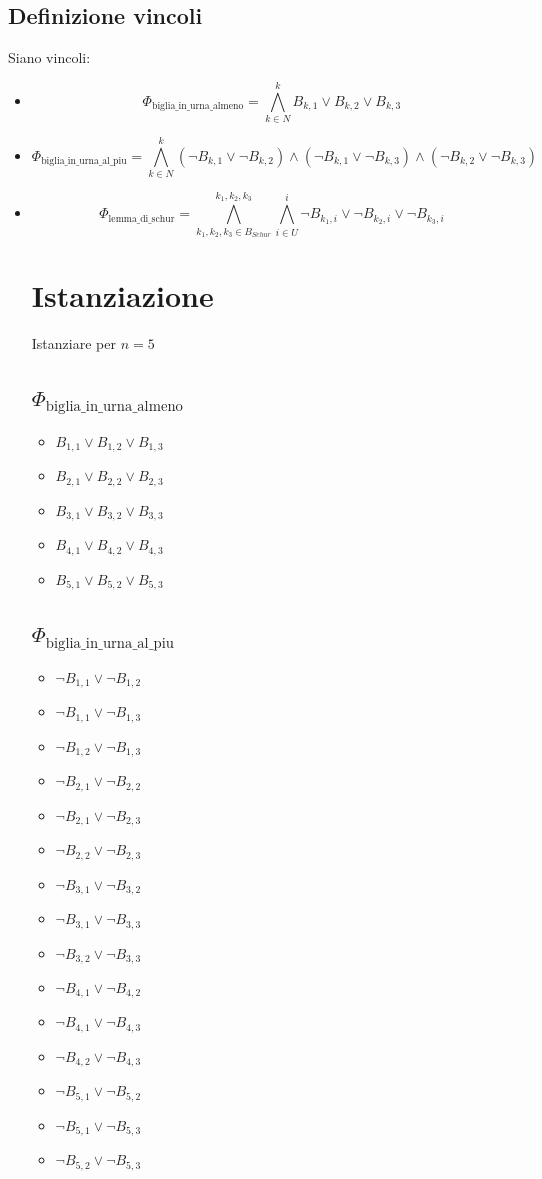 \documentclass[a4paper, 12pt]{article}
\begin{document}
\subsection{Definizione vincoli}
Siano vincoli:
\begin{itemize}[label={}]
    \item \[\Phi_{\text{biglia\_in\_urna\_almeno}}=\bigwedge_{k\in N}^{k}B_{k,1}\lor B_{k,2} \lor B_{k,3}\]
    \item \[\Phi_{\text{biglia\_in\_urna\_al\_piu}} = \bigwedge_{k\in N}^{k}(\lnot B_{k,1}\lor \lnot B_{k,2})\land (\lnot B_{k,1}\lor \lnot B_{k,3}) \land(\lnot B_{k,2}\lor \lnot B_{k,3})\]
    \item \[\Phi_{\text{lemma\_di\_schur}} = \bigwedge_{k_1,k_2,k_3\in B_{Schur}}^{k_1,k_2,k_3} \bigwedge_{i\in U}^{i} \lnot B_{k_1,i} \lor \lnot B_{k_2,i} \lor \lnot B_{k_3,i}
    \]
\section{Istanziazione}
Istanziare per $n = 5$
\subsection{$\Phi_{\text{biglia\_in\_urna\_almeno}}$}
\begin{itemize}[label={}]
\item $B_{1,1} \lor B_{1,2} \lor B_{1,3}$
\item $B_{2,1} \lor B_{2,2} \lor B_{2,3}$
\item $B_{3,1} \lor B_{3,2} \lor B_{3,3}$
\item $B_{4,1} \lor B_{4,2} \lor B_{4,3}$
\item $B_{5,1} \lor B_{5,2} \lor B_{5,3}$
\end{itemize}
\subsection{$\Phi_{\text{biglia\_in\_urna\_al\_piu}}$}
\begin{itemize}[label={}]
\item $\lnot B_{1,1} \lor \lnot B_{1,2}$
\item $\lnot B_{1,1} \lor \lnot B_{1,3}$
\item $\lnot B_{1,2} \lor \lnot B_{1,3}$
\item $\lnot B_{2,1} \lor \lnot B_{2,2}$
\item $\lnot B_{2,1} \lor \lnot B_{2,3}$
\item $\lnot B_{2,2} \lor \lnot B_{2,3}$
\item $\lnot B_{3,1} \lor \lnot B_{3,2}$
\item $\lnot B_{3,1} \lor \lnot B_{3,3}$
\item $\lnot B_{3,2} \lor \lnot B_{3,3}$
\item $\lnot B_{4,1} \lor \lnot B_{4,2}$
\item $\lnot B_{4,1} \lor \lnot B_{4,3}$
\item $\lnot B_{4,2} \lor \lnot B_{4,3}$
\item $\lnot B_{5,1} \lor \lnot B_{5,2}$
\item $\lnot B_{5,1} \lor \lnot B_{5,3}$
\item $\lnot B_{5,2} \lor \lnot B_{5,3}$
\end{itemize}

\end{itemize}
\end{document}
